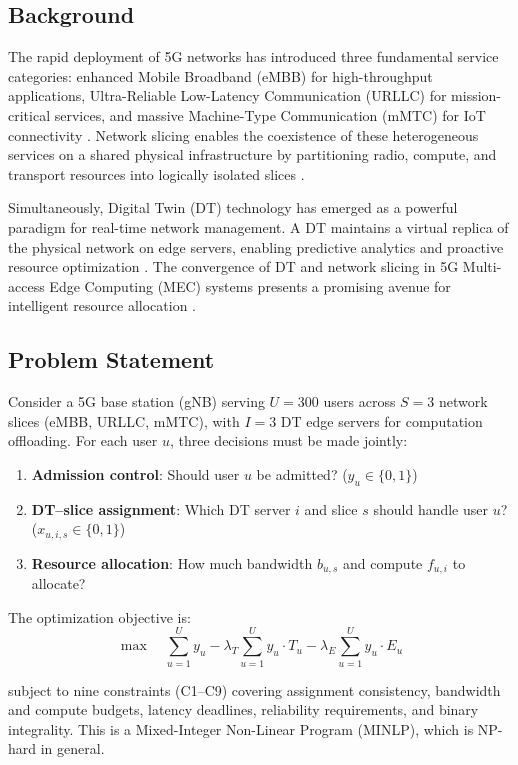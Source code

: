\documentclass[12pt]{article}
\begin{document}
\subsection{Background}
The rapid deployment of 5G networks has introduced three fundamental service categories: enhanced Mobile Broadband (eMBB) for high-throughput applications, Ultra-Reliable Low-Latency Communication (URLLC) for mission-critical services, and massive Machine-Type Communication (mMTC) for IoT connectivity \cite{popovski2018wireless}. Network slicing enables the coexistence of these heterogeneous services on a shared physical infrastructure by partitioning radio, compute, and transport resources into logically isolated slices \cite{foukas2017network}.

Simultaneously, Digital Twin (DT) technology has emerged as a powerful paradigm for real-time network management. A DT maintains a virtual replica of the physical network on edge servers, enabling predictive analytics and proactive resource optimization \cite{masood2022digital}. The convergence of DT and network slicing in 5G Multi-access Edge Computing (MEC) systems presents a promising avenue for intelligent resource allocation \cite{sun2022digital}.

\subsection{Problem Statement}
Consider a 5G base station (gNB) serving $U = 300$ users across $S = 3$ network slices (eMBB, URLLC, mMTC), with $I = 3$ DT edge servers for computation offloading. For each user $u$, three decisions must be made jointly:
\begin{enumerate}
    \item \textbf{Admission control}: Should user $u$ be admitted? ($y_u \in \{0, 1\}$)
    \item \textbf{DT--slice assignment}: Which DT server $i$ and slice $s$ should handle user $u$? ($x_{u,i,s} \in \{0, 1\}$)
    \item \textbf{Resource allocation}: How much bandwidth $b_{u,s}$ and compute $f_{u,i}$ to allocate?
\end{enumerate}

The optimization objective is:
\begin{equation}
\max \quad \sum_{u=1}^{U} y_u - \lambda_T \sum_{u=1}^{U} y_u \cdot T_u - \lambda_E \sum_{u=1}^{U} y_u \cdot E_u
\label{eq:objective}
\end{equation}

subject to nine constraints (C1--C9) covering assignment consistency, bandwidth and compute budgets, latency deadlines, reliability requirements, and binary integrality. This is a Mixed-Integer Non-Linear Program (MINLP), which is NP-hard in general.
\end{document}

